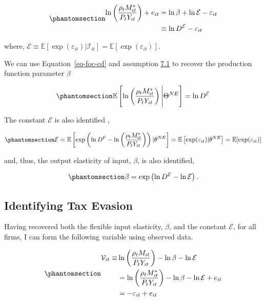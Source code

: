 \documentclass[
  12pt]{article}
\theoremstyle{definition}
\theoremstyle{remark}
\begin{document}
\begin{equation}\phantomsection\label{eq-foc-cd}{
\begin{aligned}
    \ln\left(\frac{\rho_t M^*_{it}}{P_{t}Y_{it}}\right)+e_{it}&=\ln\beta + \ln \mathcal{E}- \varepsilon_{it} \\
    &\equiv \ln D^{\mathcal{E}}- \varepsilon_{it} 
\end{aligned}
}\end{equation}

where,
\(\mathcal{E}\equiv \mathbb{E}[\exp(\varepsilon_{it})|\mathcal{I}_{it}]=\mathbb{E}[\exp(\varepsilon_{it})]\).

We can use Equation~\ref{eq-foc-cd} and assumption
\hyperref[ass-non-ev]{7.1} to recover the production function parameter
\(\beta\)

\begin{equation}\phantomsection\label{eq-foc-cd-exp}{
    \mathbb{E}\left[\ln\left(\frac{\rho_t M^*_{it}}{P_{t}Y_{it}}\right)\Bigg| \Theta^{NE}\right]=\ln D^{\mathcal{E}}
}\end{equation}

The constant \(\mathcal{E}\) is also identified \citep{Gandhi2020},

\begin{equation}\phantomsection\label{eq-id-E}{
\mathcal{E}=\mathbb{E}\left[\exp\left(\ln D^{\mathcal{E}}- \ln\left(\frac{\rho_t M^*_{it}}{P_{t}Y_{it}}\right)\right)|\theta^{NE}\right]=\mathbb{E}\left[\exp(\varepsilon_{it})|\theta^{NE}\right]=\mathbb{E}[\exp(\varepsilon_{it})]
}\end{equation}

and, thus, the output elasticity of input, \(\beta\), is also
identified,

\begin{equation}\phantomsection\label{eq-id-beta}{
\beta=\exp\left(\ln D^{\mathcal{E}}-\ln\mathcal{E}\right).
}\end{equation}

\subsection{Identifying Tax Evasion}\label{identifying-tax-evasion}

Having recovered both the flexible input elasticity, \(\beta\), and the
constant \(\mathcal{E}\), for all firms, I can form the following
variable using observed data.

\begin{equation}\phantomsection\label{eq-ob-ev}{
\begin{aligned}
    \mathcal V_{it}\equiv&\ln\left(\frac{\rho_t M_{it}}{P_{t}Y_{it}}\right)-\ln\beta -\ln\mathcal{E}\notag \\
    &=\ln\left(\frac{\rho_tM^*_{it}}{P_{t}Y_{it}}\right)-\ln\beta-\ln\mathcal{E}+e_{it} \notag \\
    &=-\varepsilon_{it} +e_{it}
\end{aligned}
}\end{equation}
\end{document}
